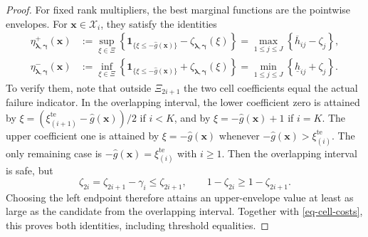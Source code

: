 \documentclass[review,11pt,3p,authoryear,nopreprintline]{elsarticle}
\begin{document}
\begin{proof}
  For fixed rank multipliers, the best marginal functions are the pointwise envelopes. For $\bm x\in\mathcal X_i$, they satisfy the identities
  \begin{equation}
    \begin{aligned}
      \eta^+_{\bm\lambda,\bm\gamma}(\bm x)
        &:=\sup_{\xi\in\Xi}\left\{\mathbf1_{\{\xi\le-\hat g(\bm x)\}}
          -\zeta_{\bm\lambda,\bm\gamma}(\xi)\right\}
          =\max_{1\le j\le J}\left\{\overline h_{ij}-\zeta_j\right\},\\
      \eta^-_{\bm\lambda,\bm\gamma}(\bm x)
        &:=\inf_{\xi\in\Xi}\left\{\mathbf1_{\{\xi\le-\hat g(\bm x)\}}
          +\zeta_{\bm\lambda,\bm\gamma}(\xi)\right\}
          =\min_{1\le j\le J}\left\{\underline h_{ij}+\zeta_j\right\}.
    \end{aligned}
    \label{eq-dual-envelope-identities}
  \end{equation}
  To verify them, note that outside $\Xi_{2i+1}$ the two cell coefficients equal the actual failure indicator. In the overlapping interval, the lower coefficient zero is attained by $\xi=\left(\xi_{(i+1)}^{\mathrm{te}}-\hat g(\bm x)\right)/2$ if $i<K$, and by $\xi=-\hat g(\bm x)+1$ if $i=K$. The upper coefficient one is attained by $\xi=-\hat g(\bm x)$ whenever $-\hat g(\bm x)>\xi_{(i)}^{\mathrm{te}}$. The only remaining case is $-\hat g(\bm x)=\xi_{(i)}^{\mathrm{te}}$ with $i\ge1$. Then the overlapping interval is safe, but
  \[
    \zeta_{2i}=\zeta_{2i+1}-\gamma_i\le\zeta_{2i+1},
    \qquad
    1-\zeta_{2i}\ge1-\zeta_{2i+1}.
  \]
  Choosing the left endpoint therefore attains an upper-envelope value at least as large as the candidate from the overlapping interval. Together with \eqref{eq-cell-costs}, this proves both identities, including threshold equalities.


\end{proof}
\end{document}

